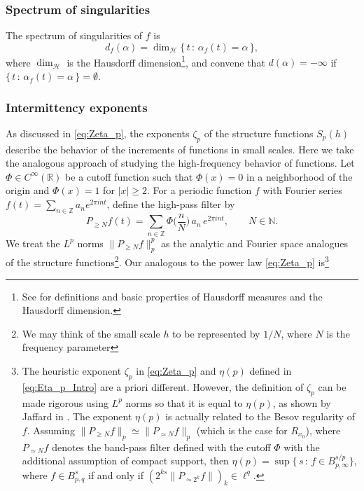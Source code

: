 \documentclass[11pt,reqno]{amsart}
\theoremstyle{definition}
\begin{document}
\subsubsection{Spectrum of singularities}
The spectrum of singularities of $f$ is
\begin{equation}
d_f(\alpha) = \operatorname{dim}_{\mathcal H} \{ \, t \, : \, \alpha_f(t) = \alpha \, \}, 
\end{equation}
where $\operatorname{dim}_{\mathcal H}$ is the Hausdorff dimension\footnote{See 
\cite[Sections 3.1-3.2]{Falconer2014} for definitions and basic properties of Hausdorff measures and the Hausdorff dimension.}, 
and convene that $d(\alpha) = -\infty$ if $\{ \, t \, : \, \alpha_f(t) = \alpha \, \} = \emptyset$. 


\subsubsection{Intermittency exponents}
 As discussed in \eqref{eq:Zeta_p}, the exponents $\zeta_p$ of the structure functions $S_p(h)$ describe the behavior of the increments of functions in small scales. 
Here we take the analogous approach of studying the 
high-frequency behavior of functions. 
Let $\Phi \in C^\infty (\mathbb R)$ be a cutoff function such that
$\Phi(x) = 0$ in a neighborhood of the origin 
and $\Phi(x) = 1$ for $|x| \geq 2$.  
For a periodic function $f$ with Fourier series $f(t) = \sum_{n \in \mathbb Z} a_n e^{2\pi i n t}$, 
define the
high-pass filter by 
\begin{equation}
P_{\geq N} f(t) = \sum_{n \in \mathbb Z} \Phi\Big(  \frac{n}{N} \Big) \,  a_n \, e^{2\pi i n t }, 
\qquad
N \in \mathbb N. 
\end{equation}
We treat the $L^p$ norms $\lVert P_{\geq N} f \rVert_p^p$ as the analytic and Fourier space analogues of the structure functions\footnote{We may think of the small scale $h$ to be represented by $1/N$, where $N$ is the frequency parameter}. 
Our analogous to the power law \eqref{eq:Zeta_p} is\footnote{
The heuristic exponent $\zeta_p$ in \eqref{eq:Zeta_p} and $\eta(p)$ defined in \eqref{eq:Eta_p_Intro} are a priori different. 
However, the definition of $\zeta_p$ can be made rigorous using $L^p$ norms so that it is equal to $\eta(p)$, as shown by Jaffard in \cite[Prop. 3.1]{Jaffard1997_1}.  
The exponent $\eta(p)$ is actually related to the Besov regularity of $f$.
Assuming $\lVert  P_{\geq N} f \rVert_p \simeq \lVert  P_{\simeq N} f \rVert_p$ (which is the case for $R_{x_0}$), where $P_{\simeq N} f$ denotes the band-pass filter defined with the cutoff $\Phi$ with the additional assumption of compact support, then $\eta(p) = \sup \{ \, s \, : \, f \in B^{s/p}_{p,\infty} \}$, 
where $f \in B^s_{p,q}$ if and only if $(2^{ks}\lVert P_{\simeq 2^k} f \rVert)_k \in \ell^q$. 
} 
\end{document}
